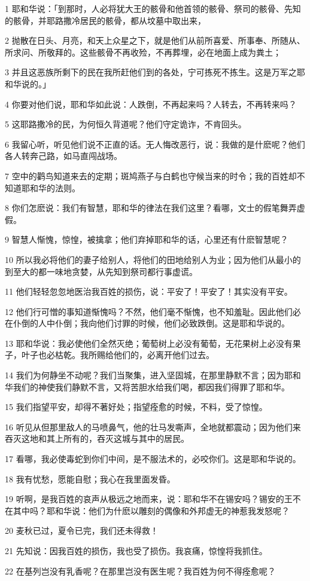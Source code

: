 \par 1 耶和华说：「到那时，人必将犹大王的骸骨和他首领的骸骨、祭司的骸骨、先知的骸骨，并耶路撒冷居民的骸骨，都从坟墓中取出来，
\par 2 抛散在日头、月亮，和天上众星之下，就是他们从前所喜爱、所事奉、所随从、所求问、所敬拜的。这些骸骨不再收殓，不再葬埋，必在地面上成为粪土；
\par 3 并且这恶族所剩下的民在我所赶他们到的各处，宁可拣死不拣生。这是万军之耶和华说的。」
\par 4 你要对他们说，耶和华如此说：人跌倒，不再起来吗？人转去，不再转来吗？
\par 5 这耶路撒冷的民，为何恒久背道呢？他们守定诡诈，不肯回头。
\par 6 我留心听，听见他们说不正直的话。无人悔改恶行，说：我做的是什麽呢？他们各人转奔己路，如马直闯战场。
\par 7 空中的鹳鸟知道来去的定期；斑鸠燕子与白鹤也守候当来的时令；我的百姓却不知道耶和华的法则。
\par 8 你们怎麽说：我们有智慧，耶和华的律法在我们这里？看哪，文士的假笔舞弄虚假。
\par 9 智慧人惭愧，惊惶，被擒拿；他们弃掉耶和华的话，心里还有什麽智慧呢？
\par 10 所以我必将他们的妻子给别人，将他们的田地给别人为业；因为他们从最小的到至大的都一味地贪婪，从先知到祭司都行事虚谎。
\par 11 他们轻轻忽忽地医治我百姓的损伤，说：平安了！平安了！其实没有平安。
\par 12 他们行可憎的事知道惭愧吗？不然，他们毫不惭愧，也不知羞耻。因此他们必在仆倒的人中仆倒；我向他们讨罪的时候，他们必致跌倒。这是耶和华说的。
\par 13 耶和华说：我必使他们全然灭绝；葡萄树上必没有葡萄，无花果树上必没有果子，叶子也必枯乾。我所赐给他们的，必离开他们过去。
\par 14 我们为何静坐不动呢？我们当聚集，进入坚固城，在那里静默不言；因为耶和华我们的神使我们静默不言，又将苦胆水给我们喝，都因我们得罪了耶和华。
\par 15 我们指望平安，却得不著好处；指望痊愈的时候，不料，受了惊惶。
\par 16 听见从但那里敌人的马喷鼻气，他的壮马发嘶声，全地就都震动；因为他们来吞灭这地和其上所有的，吞灭这城与其中的居民。
\par 17 看哪，我必使毒蛇到你们中间，是不服法术的，必咬你们。这是耶和华说的。
\par 18 我有忧愁，愿能自慰；我心在我里面发昏。
\par 19 听啊，是我百姓的哀声从极远之地而来，说：耶和华不在锡安吗？锡安的王不在其中吗？耶和华说：他们为什麽以雕刻的偶像和外邦虚无的神惹我发怒呢？
\par 20 麦秋已过，夏令已完，我们还未得救！
\par 21 先知说：因我百姓的损伤，我也受了损伤。我哀痛，惊惶将我抓住。
\par 22 在基列岂没有乳香呢？在那里岂没有医生呢？我百姓为何不得痊愈呢？


